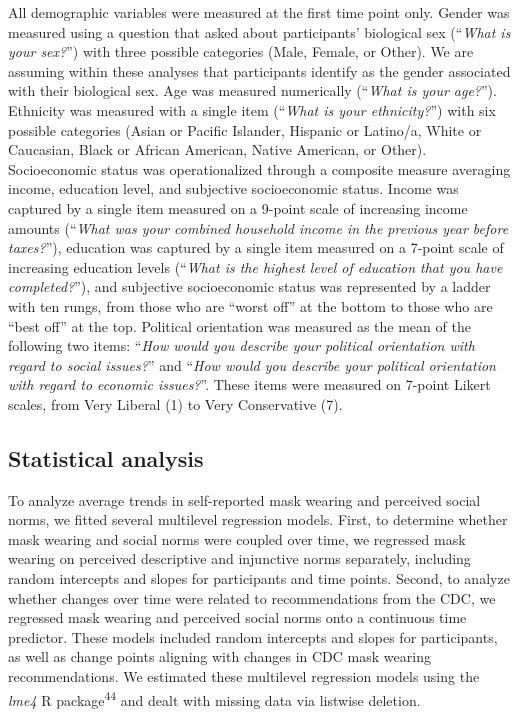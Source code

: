 \documentclass[
  man, donotrepeattitle,floatsintext]{apa6}
\begin{document}
All demographic variables were measured at the first time point only. Gender was measured using a question that asked about participants' biological sex (``\emph{What is your sex?}'') with three possible categories (Male, Female, or Other). We are assuming within these analyses that participants identify as the gender associated with their biological sex. Age was measured numerically (``\emph{What is your age?}''). Ethnicity was measured with a single item (``\emph{What is your ethnicity?}'') with six possible categories (Asian or Pacific Islander, Hispanic or Latino/a, White or Caucasian, Black or African American, Native American, or Other). Socioeconomic status was operationalized through a composite measure averaging income, education level, and subjective socioeconomic status. Income was captured by a single item measured on a 9-point scale of increasing income amounts (``\emph{What was your combined household income in the previous year before taxes?}''), education was captured by a single item measured on a 7-point scale of increasing education levels (``\emph{What is the highest level of education that you have completed?}''), and subjective socioeconomic status was represented by a ladder with ten rungs, from those who are ``worst off'' at the bottom to those who are ``best off'' at the top. Political orientation was measured as the mean of the following two items: ``\emph{How would you describe your political orientation with regard to social issues?}'' and ``\emph{How would you describe your political orientation with regard to economic issues?}''. These items were measured on 7-point Likert scales, from Very Liberal (1) to Very Conservative (7).

\hypertarget{statistical-analysis}{%
\subsection{Statistical analysis}\label{statistical-analysis}}

To analyze average trends in self-reported mask wearing and perceived social norms, we fitted several multilevel regression models. First, to determine whether mask wearing and social norms were coupled over time, we regressed mask wearing on perceived descriptive and injunctive norms separately, including random intercepts and slopes for participants and time points. Second, to analyze whether changes over time were related to recommendations from the CDC, we regressed mask wearing and perceived social norms onto a continuous time predictor. These models included random intercepts and slopes for participants, as well as change points aligning with changes in CDC mask wearing recommendations. We estimated these multilevel regression models using the \emph{lme4} R package\textsuperscript{44} and dealt with missing data via listwise deletion.
\end{document}

